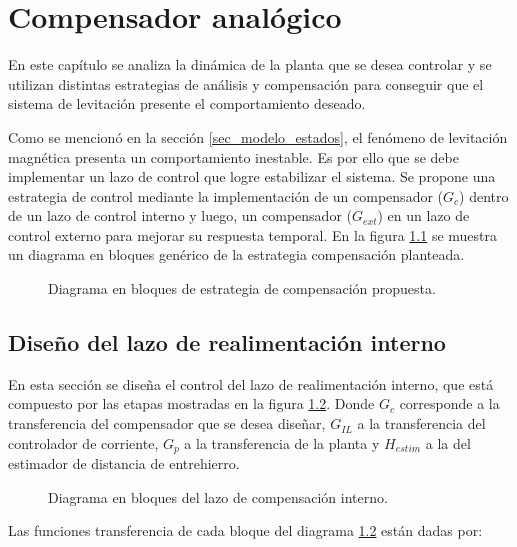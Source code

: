 \chapter{Compensador analógico}  \label{cap:Compensador Analogico}

En este capítulo se analiza la dinámica de la planta que se desea controlar y se utilizan distintas estrategias de análisis y compensación para conseguir que el sistema de levitación presente el comportamiento deseado. 

Como se mencionó en la sección \ref{sec_modelo_estados}, el fenómeno de levitación magnética presenta un comportamiento inestable. Es por ello que se debe implementar un lazo de control que logre estabilizar el sistema. Se propone una estrategia de control mediante la implementación de un compensador ($G_c$) dentro de un lazo de control interno y luego, un compensador ($G_{ext}$) en un lazo de control externo para mejorar su respuesta temporal. En la figura \ref{fig:diag-en-bloques-comp} se muestra un diagrama en bloques genérico de la estrategia compensación planteada.

\begin{figure}[H]
	\centering
	\scalebox{0.8}{}
	\caption{Diagrama en bloques de estrategia de compensación propuesta.}	\label{fig:diag-en-bloques-comp}
\end{figure}

\section{Diseño del lazo de realimentación interno}

En esta sección se diseña el control del lazo de realimentación interno, que está compuesto por las etapas mostradas en la figura \ref{fig:diag-interno}. Donde $G_c$ corresponde a la transferencia del compensador que se desea diseñar, $G_{IL}$ a la transferencia del controlador de corriente, $G_p$ a la transferencia de la planta y $H_{estim}$ a la del estimador de distancia de entrehierro.


\begin{figure}[H]
	\centering
	
	\caption{Diagrama en bloques del lazo de compensación interno.}	\label{fig:diag-interno}
\end{figure}

Las funciones transferencia de cada bloque del diagrama \ref{fig:diag-interno} están dadas por:

